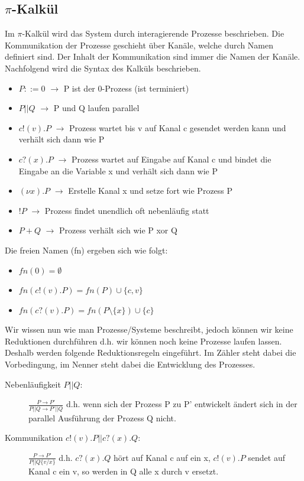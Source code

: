 \documentclass[11pt, fleqn, a4paper, leqno]{scrartcl} %
\begin{document}
	\subsection{$\pi$-Kalkül}
		Im $\pi$-Kalkül wird das System durch interagierende Prozesse beschrieben. Die Kommunikation der Prozesse geschieht über Kanäle, welche durch Namen definiert sind. Der Inhalt der Kommunikation sind immer die Namen der Kanäle. Nachfolgend wird die Syntax des Kalküls beschrieben.
		\begin{itemize}
			\item $P::= 0$ $\rightarrow$ P ist der 0-Prozess (ist terminiert)
			\item $P||Q$ $\rightarrow$ P und Q laufen parallel
			\item $c!(v).P$ $\rightarrow$ Prozess wartet bis v auf Kanal c gesendet werden kann und verhält sich dann wie P
			\item $c?(x).P$ $\rightarrow$ Prozess wartet auf Eingabe auf Kanal c und bindet die Eingabe an die Variable x und verhält sich dann wie P
			\item $(\nu x).P$ $\rightarrow$ Erstelle Kanal x und setze fort wie Prozess P
			\item $!P$ $\rightarrow$ Prozess findet unendlich oft nebenläufig statt
			\item $P+Q$ $\rightarrow$ Prozess verhält sich wie P xor Q
		\end{itemize}
		Die freien Namen (fn) ergeben sich wie folgt:
		\begin{itemize}
			\item $fn(0) = \emptyset$
			\item $fn(c!(v).P) = fn(P) \cup \{c,v\}$
			\item $fn(c?(v).P) = fn(P\setminus\{x\}) \cup \{c\} $
		\end{itemize}
		Wir wissen nun wie man Prozesse/Systeme beschreibt, jedoch können wir keine Reduktionen durchführen d.h. wir können noch keine Prozesse laufen lassen. Deshalb werden folgende Reduktionsregeln eingeführt. Im Zähler steht dabei die Vorbedingung, im Nenner steht dabei die Entwicklung des Prozesses.
		\begin{description}
			\item [Nebenläufigkeit $P||Q$:] $\frac{P \rightarrow P'}{P||Q \rightarrow P'||Q}$ d.h. wenn sich der Prozess P zu P' entwickelt ändert sich in der parallel Ausführung der Prozess Q nicht.
			\item [Kommunikation $c!(v).P || c?(x).Q$:] $\frac{P \rightarrow P'}{P || Q\{v/x\}}$ d.h. $c?(x).Q$ hört auf Kanal c auf ein x, $c!(v).P$ sendet auf Kanal c ein v, so werden in Q alle x durch v ersetzt.
		\end{description}
\end{document}
